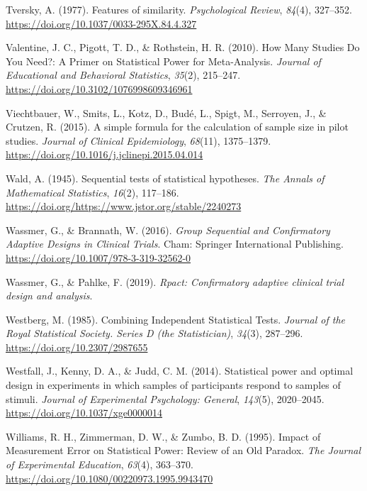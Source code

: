 \documentclass[
  english,
  ,jou, a4paper,floatsintext]{apa6}
\newlength{\cslhangindent}
\newenvironment{cslreferences}%
  {\setlength{\parindent}{0pt}%
  \everypar{\setlength{\hangindent}{\cslhangindent}}\ignorespaces}%
  {\par}
\begin{document}
\begin{cslreferences}
\leavevmode\hypertarget{ref-tversky_features_1977}{}%
Tversky, A. (1977). Features of similarity. \emph{Psychological Review}, \emph{84}(4), 327--352. \url{https://doi.org/10.1037/0033-295X.84.4.327}

\leavevmode\hypertarget{ref-valentine_how_2010}{}%
Valentine, J. C., Pigott, T. D., \& Rothstein, H. R. (2010). How Many Studies Do You Need?: A Primer on Statistical Power for Meta-Analysis. \emph{Journal of Educational and Behavioral Statistics}, \emph{35}(2), 215--247. \url{https://doi.org/10.3102/1076998609346961}

\leavevmode\hypertarget{ref-viechtbauer_simple_2015}{}%
Viechtbauer, W., Smits, L., Kotz, D., Budé, L., Spigt, M., Serroyen, J., \& Crutzen, R. (2015). A simple formula for the calculation of sample size in pilot studies. \emph{Journal of Clinical Epidemiology}, \emph{68}(11), 1375--1379. \url{https://doi.org/10.1016/j.jclinepi.2015.04.014}

\leavevmode\hypertarget{ref-wald_sequential_1945}{}%
Wald, A. (1945). Sequential tests of statistical hypotheses. \emph{The Annals of Mathematical Statistics}, \emph{16}(2), 117--186. \url{https://doi.org/https://www.jstor.org/stable/2240273}

\leavevmode\hypertarget{ref-wassmer_group_2016}{}%
Wassmer, G., \& Brannath, W. (2016). \emph{Group Sequential and Confirmatory Adaptive Designs in Clinical Trials}. Cham: Springer International Publishing. \url{https://doi.org/10.1007/978-3-319-32562-0}

\leavevmode\hypertarget{ref-wassmer_rpact_2019}{}%
Wassmer, G., \& Pahlke, F. (2019). \emph{Rpact: Confirmatory adaptive clinical trial design and analysis}.

\leavevmode\hypertarget{ref-westberg_combining_1985}{}%
Westberg, M. (1985). Combining Independent Statistical Tests. \emph{Journal of the Royal Statistical Society. Series D (the Statistician)}, \emph{34}(3), 287--296. \url{https://doi.org/10.2307/2987655}

\leavevmode\hypertarget{ref-westfall_statistical_2014}{}%
Westfall, J., Kenny, D. A., \& Judd, C. M. (2014). Statistical power and optimal design in experiments in which samples of participants respond to samples of stimuli. \emph{Journal of Experimental Psychology: General}, \emph{143}(5), 2020--2045. \url{https://doi.org/10.1037/xge0000014}

\leavevmode\hypertarget{ref-williams_impact_1995}{}%
Williams, R. H., Zimmerman, D. W., \& Zumbo, B. D. (1995). Impact of Measurement Error on Statistical Power: Review of an Old Paradox. \emph{The Journal of Experimental Education}, \emph{63}(4), 363--370. \url{https://doi.org/10.1080/00220973.1995.9943470}


\end{cslreferences}
\end{document}
